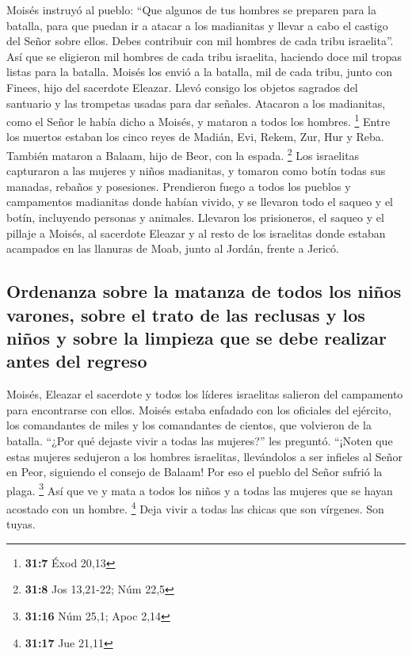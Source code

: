  Moisés instruyó al pueblo: ``Que algunos de tus hombres
se preparen para la batalla, para que puedan ir a atacar a los
madianitas y llevar a cabo el castigo del Señor sobre ellos.
 Debes contribuir con mil hombres de cada tribu
israelita''.  Así que se eligieron mil hombres de cada
tribu israelita, haciendo doce mil tropas listas para la batalla.
 Moisés los envió a la batalla, mil de cada tribu, junto
con Finees, hijo del sacerdote Eleazar. Llevó consigo los objetos
sagrados del santuario y las trompetas usadas para dar señales.
 Atacaron a los madianitas, como el Señor le había dicho a
Moisés, y mataron a todos los hombres. \footnote{\textbf{31:7} Éxod
  20,13}  Entre los muertos estaban los cinco reyes de
Madián, Evi, Rekem, Zur, Hur y Reba. También mataron a Balaam, hijo de
Beor, con la espada. \footnote{\textbf{31:8} Jos 13,21-22; Núm 22,5}
 Los israelitas capturaron a las mujeres y niños
madianitas, y tomaron como botín todas sus manadas, rebaños y
posesiones.  Prendieron fuego a todos los pueblos y
campamentos madianitas donde habían vivido,  y se
llevaron todo el saqueo y el botín, incluyendo personas y animales.
 Llevaron los prisioneros, el saqueo y el pillaje a
Moisés, al sacerdote Eleazar y al resto de los israelitas donde estaban
acampados en las llanuras de Moab, junto al Jordán, frente a Jericó.

\hypertarget{ordenanza-sobre-la-matanza-de-todos-los-niuxf1os-varones-sobre-el-trato-de-las-reclusas-y-los-niuxf1os-y-sobre-la-limpieza-que-se-debe-realizar-antes-del-regreso}{%
\subsection{Ordenanza sobre la matanza de todos los niños varones, sobre
el trato de las reclusas y los niños y sobre la limpieza que se debe
realizar antes del
regreso}\label{ordenanza-sobre-la-matanza-de-todos-los-niuxf1os-varones-sobre-el-trato-de-las-reclusas-y-los-niuxf1os-y-sobre-la-limpieza-que-se-debe-realizar-antes-del-regreso}}

 Moisés, Eleazar el sacerdote y todos los líderes
israelitas salieron del campamento para encontrarse con ellos.
 Moisés estaba enfadado con los oficiales del ejército,
los comandantes de miles y los comandantes de cientos, que volvieron de
la batalla.  ``¿Por qué dejaste vivir a todas las
mujeres?'' les preguntó.  ``¡Noten que estas mujeres
sedujeron a los hombres israelitas, llevándolos a ser infieles al Señor
en Peor, siguiendo el consejo de Balaam! Por eso el pueblo del Señor
sufrió la plaga. \footnote{\textbf{31:16} Núm 25,1; Apoc 2,14}
 Así que ve y mata a todos los niños y a todas las
mujeres que se hayan acostado con un hombre. \footnote{\textbf{31:17}
  Jue 21,11}  Deja vivir a todas las chicas que son
vírgenes. Son tuyas.

